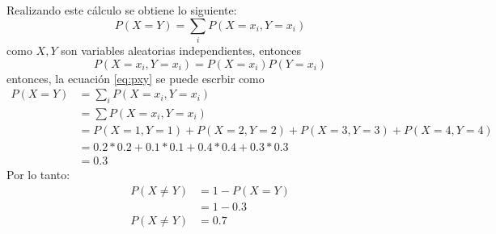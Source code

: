 \begin{itemize}
          Realizando este cálculo se obtiene lo siguiente:
          \begin{equation}
              P(X=Y) = \sum_i P(X=x_i,Y=x_i)
              \label{eq:pxy}
          \end{equation}
          como $X,Y$ son variables aleatorias independientes, entonces
          \begin{equation*}
              P(X=x_i,Y=x_i) = P(X=x_i)P(Y=x_i)
          \end{equation*}
          entonces, la ecuación \ref{eq:pxy} se puede escrbir como
          \begin{align*}
              P(X=Y) & = \sum_i P(X=x_i,Y=x_i)                      \\
                     & =\sum P(X=x_i,Y=x_i)                         \\
                     & =P(X=1,Y=1)+P(X=2,Y=2)+P(X=3,Y=3)+P(X=4,Y=4) \\
                     & = 0.2*0.2+0.1*0.1+0.4*0.4+0.3*0.3            \\
                     & = 0.3
          \end{align*}
          Por lo tanto:
          \begin{align*}
              P(X\neq Y) & = 1- P(X=Y) \\
                         & = 1-0.3     \\
              P(X\neq Y) & = 0.7
          \end{align*}
\end{itemize}